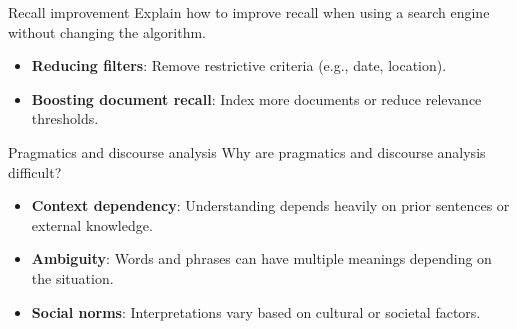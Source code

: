 \documentclass{article}
\begin{document}
\begin{exercise}{Recall improvement}
  Explain how to improve recall when using a search engine without changing the algorithm.

  \begin{solution}
    \begin{itemize}
        \item \textbf{Reducing filters}: Remove restrictive criteria (e.g., date, location).
        \item \textbf{Boosting document recall}: Index more documents or reduce relevance thresholds.
    \end{itemize}
  \end{solution}
\end{exercise}

\begin{exercise}{Pragmatics and discourse analysis}\label{ex:pragmatics}
  Why are pragmatics and discourse analysis difficult?

  \begin{solution}
    \begin{itemize}
      \item \textbf{Context dependency}: Understanding depends heavily on prior sentences or external knowledge.
      \item \textbf{Ambiguity}: Words and phrases can have multiple meanings depending on the situation.
      \item \textbf{Social norms}: Interpretations vary based on cultural or societal factors.
    \end{itemize}
  \end{solution}
\end{exercise}
\end{document}
